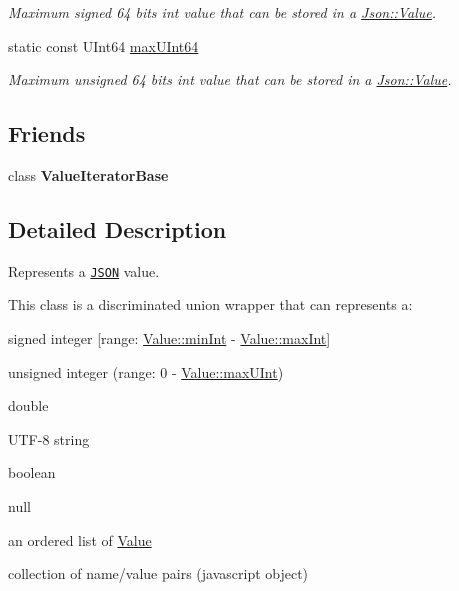 \begin{DoxyCompactItemize}
\begin{DoxyCompactList}\small\item\em Maximum signed 64 bits int value that can be stored in a \hyperlink{class_json_1_1_value}{Json\+::\+Value}. \end{DoxyCompactList}\item 
static const U\+Int64 \hyperlink{class_json_1_1_value_ae1eb89c305c39516696ff305cffa01da}{max\+U\+Int64}\hypertarget{class_json_1_1_value_ae1eb89c305c39516696ff305cffa01da}{}\label{class_json_1_1_value_ae1eb89c305c39516696ff305cffa01da}

\begin{DoxyCompactList}\small\item\em Maximum unsigned 64 bits int value that can be stored in a \hyperlink{class_json_1_1_value}{Json\+::\+Value}. \end{DoxyCompactList}\end{DoxyCompactItemize}
\subsection*{Friends}
\begin{DoxyCompactItemize}
\item 
class {\bfseries Value\+Iterator\+Base}\hypertarget{class_json_1_1_value_ad016df56489e5d360735457afba2f649}{}\label{class_json_1_1_value_ad016df56489e5d360735457afba2f649}

\end{DoxyCompactItemize}


\subsection{Detailed Description}
Represents a \href{http://www.json.org}{\tt J\+S\+ON} value. 

This class is a discriminated union wrapper that can represents a\+:
\begin{DoxyItemize}
\item signed integer \mbox{[}range\+: \hyperlink{class_json_1_1_value_a7df8a39e2502b8c92a6a41e3d752d2c8}{Value\+::min\+Int} -\/ \hyperlink{class_json_1_1_value_a978c799a8af3114ef7dab6fd0a310a1b}{Value\+::max\+Int}\mbox{]}
\item unsigned integer (range\+: 0 -\/ \hyperlink{class_json_1_1_value_ac79e63ee68d3aa914bfd6988be669b87}{Value\+::max\+U\+Int})
\item double
\item U\+T\+F-\/8 string
\item boolean
\item \textquotesingle{}null\textquotesingle{}
\item an ordered list of \hyperlink{class_json_1_1_value}{Value}
\item collection of name/value pairs (javascript object)
\end{DoxyItemize}

